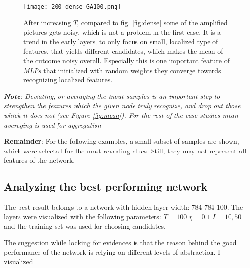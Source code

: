 \begin{figure}
    \centering
    \texttt{[image: 200-dense-GA100.png]}
    \caption{After increasing $T$, compared to fig. \ref{fig:dense} some of the amplified pictures gets noisy, which is not a problem in the first case. It is a trend in the early layers, to only focus on small, localized type of features, that yields different candidates, which makes the mean of the outcome noisy overall. Especially this is one important feature of \emph{MLPs} that initialized with random weights they converge towards recognizing localized features.}
    \label{fig:dense-100}
\end{figure}


\emph{\textbf{Note}: Deviating, or averaging the input samples is an important step to strengthen the features which the given node truly recognize, and drop out those which it does not (see Figure \ref{fig:mean}). For the rest of the case studies mean averaging is used for aggregation}

\textbf{Remainder}: For the following examples, a small subset of samples are shown, which were selected for the most revealing clues. Still, they may not represent all features of the network.


\subsection{Analyzing the best performing network}
The best result belongs to a network with hidden layer width: 784-784-100. 
The layers were visualized with the following parameters:
$T=100$
$\eta=0.1$
$I=10, 50$
and the training set was used for choosing candidates.

The suggestion while looking for evidences is that the reason behind the good performance of the network is relying on different levels of abstraction.
I visualized